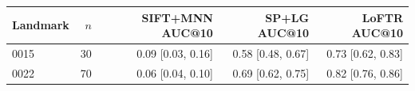 \begin{tabular}{lrrrr}
\toprule
Landmark & $n$ & SIFT+MNN AUC@10 & SP+LG AUC@10 & LoFTR AUC@10 \\
\midrule
0015 & 30 & 0.09 [0.03, 0.16] & 0.58 [0.48, 0.67] & 0.73 [0.62, 0.83] \\
0022 & 70 & 0.06 [0.04, 0.10] & 0.69 [0.62, 0.75] & 0.82 [0.76, 0.86] \\
\bottomrule
\end{tabular}